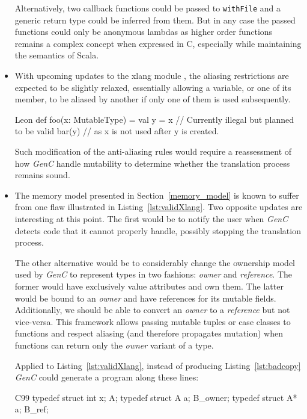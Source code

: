 \documentclass[a4paper,twoside]{article}
\newcommand{\InlineS}[1]{\lstinline[language=Leon]|#1|}
\newcommand{\GenC}{\emph{GenC}\xspace}
\newcommand{\RefSec}[1]{Section~\ref{#1}}
\newcommand{\RefCode}[1]{Listing~\ref{#1}}
\begin{document}
\begin{itemize}
Alternatively, two callback functions could be passed to \InlineS{withFile} and
a generic return type could be inferred from them. But in any case the passed
functions could only be anonymous lambdas as higher order functions remains a
complex concept when expressed in C, especially while maintaining the semantics
of Scala.

\item With upcoming updates to the xlang module \cite{xlang}, the aliasing
restrictions are expected to be slightly relaxed, essentially allowing a
variable, or one of its member, to be aliased by another if only one of them is
used subsequently.

\begin{ShortCode}{Leon}
def foo(x: MutableType) = {
  val y = x // Currently illegal but planned to be valid
  bar(y)    // as x is not used after y is created.
}
\end{ShortCode}

Such modification of the anti-aliasing rules would require a reassessment of how
\GenC handle mutability to determine whether the translation process remains
sound.

\item The memory model presented in \RefSec{memory_model} is known to suffer
from one flaw illustrated in \RefCode{lst:validXlang}. Two opposite updates are
interesting at this point. The first would be to notify the user when \GenC
detects code that it cannot properly handle, possibly stopping the translation
process.

The other alternative would be to considerably change the ownership model used
by \GenC to represent types in two fashions: \emph{owner} and \emph{reference}.
The former would have exclusively value attributes and own them. The latter
would be bound to an \emph{owner} and have references for its mutable fields.
Additionally, we should be able to convert an \emph{owner} to a \emph{reference}
but not vice-versa. This framework allows passing mutable tuples or case classes
to functions and respect aliasing (and therefore propagates mutation) when
functions can return only the \emph{owner} variant of a type.

Applied to \RefCode{lst:validXlang}, instead of producing \RefCode{lst:badcopy}
\GenC could generate a program along these lines:

\begin{ShortCode}{C99}
typedef struct { int x; } A;
typedef struct { A   a; } B_owner;
typedef struct { A*  a; } B_ref;


\end{ShortCode}
\end{itemize}
\end{document}
